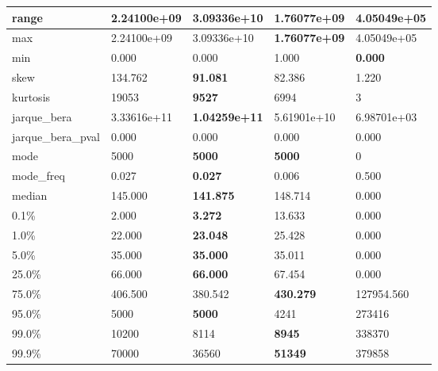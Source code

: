 \begin{table}[H]
\begin{tabular}{|l|m{10em}|m{10em}|m{10em}|m{10em}|}
\hline range & 2.24100e+09 & \cellcolor[rgb]{0.9, 0.54, 0.52} 3.09336e+10 & \bfseries 1.76077e+09 & 4.05049e+05 \\
\hline max & 2.24100e+09 & \cellcolor[rgb]{0.9, 0.54, 0.52} 3.09336e+10 & \bfseries 1.76077e+09 & 4.05049e+05 \\
\hline min & 0.000 & 0.000 & \cellcolor[rgb]{0.9, 0.54, 0.52} 1.000 & \bfseries 0.000 \\
\hline skew & 134.762 & \bfseries 91.081 & 82.386 & \cellcolor[rgb]{0.9, 0.54, 0.52} 1.220 \\
\hline kurtosis & 19053 & \bfseries 9527 & 6994 & \cellcolor[rgb]{0.9, 0.54, 0.52} 3 \\
\hline jarque\_bera & 3.33616e+11 & \bfseries 1.04259e+11 & 5.61901e+10 & \cellcolor[rgb]{0.9, 0.54, 0.52} 6.98701e+03 \\
\hline jarque\_bera\_pval & 0.000 & 0.000 & 0.000 & 0.000 \\
\hline mode & 5000 & \bfseries 5000 & \bfseries 5000 & \cellcolor[rgb]{0.9, 0.54, 0.52} 0 \\
\hline mode\_freq & 0.027 & \bfseries 0.027 & 0.006 & \cellcolor[rgb]{0.9, 0.54, 0.52} 0.500 \\
\hline median & 145.000 & \bfseries 141.875 & 148.714 & \cellcolor[rgb]{0.9, 0.54, 0.52} 0.000 \\
\hline 0.1\% & 2.000 & \bfseries 3.272 & \cellcolor[rgb]{0.9, 0.54, 0.52} 13.633 & 0.000 \\
\hline 1.0\% & 22.000 & \bfseries 23.048 & 25.428 & \cellcolor[rgb]{0.9, 0.54, 0.52} 0.000 \\
\hline 5.0\% & 35.000 & \bfseries 35.000 & 35.011 & \cellcolor[rgb]{0.9, 0.54, 0.52} 0.000 \\
\hline 25.0\% & 66.000 & \bfseries 66.000 & 67.454 & \cellcolor[rgb]{0.9, 0.54, 0.52} 0.000 \\
\hline 75.0\% & 406.500 & 380.542 & \bfseries 430.279 & \cellcolor[rgb]{0.9, 0.54, 0.52} 127954.560 \\
\hline 95.0\% & 5000 & \bfseries 5000 & 4241 & \cellcolor[rgb]{0.9, 0.54, 0.52} 273416 \\
\hline 99.0\% & 10200 & 8114 & \bfseries 8945 & \cellcolor[rgb]{0.9, 0.54, 0.52} 338370 \\
\hline 99.9\% & 70000 & 36560 & \bfseries 51349 & \cellcolor[rgb]{0.9, 0.54, 0.52} 379858 \\
\hline
\end{tabular}
\end{table}
